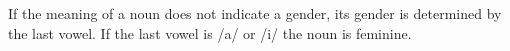 If the meaning of a noun does not indicate a gender, its gender is determined by the last vowel. If the last vowel is /a/ or /i/ the noun is feminine.
